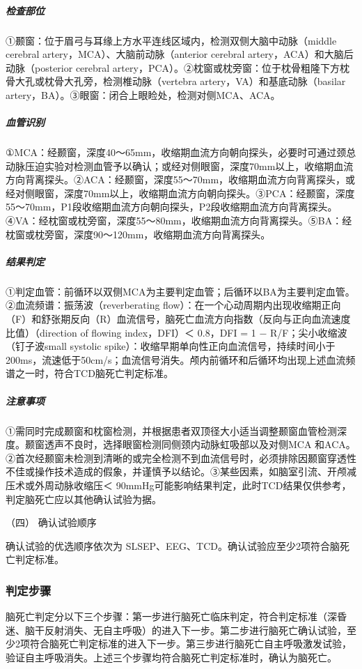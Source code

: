 \subparagraph{检查部位}

①颞窗：位于眉弓与耳缘上方水平连线区域内，检测双侧大脑中动脉（middle
cerebral artery，MCA）、大脑前动脉（anterior cerebral
artery，ACA）和大脑后动脉（posterior cerebral
artery，PCA）。②枕窗或枕旁窗：位于枕骨粗隆下方枕骨大孔或枕骨大孔旁，检测椎动脉（vertebra
artery，VA）和基底动脉（basilar
artery，BA）。③眼窗：闭合上眼睑处，检测对侧MCA、ACA。

\subparagraph{血管识别}

①MCA：经颞窗，深度40～65mm，收缩期血流方向朝向探头，必要时可通过颈总动脉压迫实验对检测血管予以确认；或经对侧眼窗，深度70mm以上，收缩期血流方向背离探头。②ACA：经颞窗，深度55～70mm，收缩期血流方向背离探头，或经对侧眼窗，深度70mm以上，收缩期血流方向朝向探头。③PCA：经颞窗，深度55～70mm，P1段收缩期血流方向朝向探头，P2段收缩期血流方向背离探头。④VA：经枕窗或枕旁窗，深度55～80mm，收缩期血流方向背离探头。⑤BA：经枕窗或枕旁窗，深度90～120mm，收缩期血流方向背离探头。

\subparagraph{结果判定}

①判定血管：前循环以双侧MCA为主要判定血管；后循环以BA为主要判定血管。②血流频谱：振荡波（reverberating
flow）：在一个心动周期内出现收缩期正向（F）和舒张期反向（R）血流信号，脑死亡血流方向指数（反向与正向血流速度比值）（direction
of flowing index，DFI）＜ 0.8，DFI = 1 − R/F；尖小收缩波（钉子波small
systolic
spike）：收缩早期单向性正向血流信号，持续时间小于200ms，流速低于50cm/s；血流信号消失。颅内前循环和后循环均出现上述血流频谱之一时，符合TCD脑死亡判定标准。

\subparagraph{注意事项}

①需同时完成颞窗和枕窗检测，并根据患者双顶径大小适当调整颞窗血管检测深度。颞窗透声不良时，选择眼窗检测同侧颈内动脉虹吸部以及对侧MCA
和ACA。②首次经颞窗未检测到清晰的或完全检测不到血流信号时，必须排除因颞窗穿透性不佳或操作技术造成的假象，并谨慎予以结论。③某些因素，如脑室引流、开颅减压术或外周动脉收缩压＜
90mmHg可能影响结果判定，此时TCD结果仅供参考，判定脑死亡应以其他确认试验为据。

\hypertarget{text00069.htmlux5cux23CHP3-1-5-3-4}{}
（四） 确认试验顺序

确认试验的优选顺序依次为
SLSEP、EEG、TCD。确认试验应至少2项符合脑死亡判定标准。

\subsubsection{判定步骤}

脑死亡判定分以下三个步骤：第一步进行脑死亡临床判定，符合判定标准（深昏迷、脑干反射消失、无自主呼吸）的进入下一步。第二步进行脑死亡确认试验，至少2项符合脑死亡判定标准的进入下一步。第三步进行脑死亡自主呼吸激发试验，验证自主呼吸消失。上述三个步骤均符合脑死亡判定标准时，确认为脑死亡。

